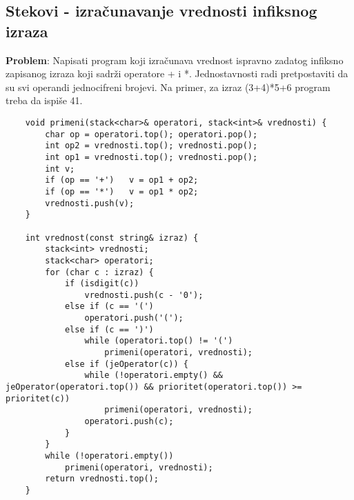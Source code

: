 \documentclass{article}
\begin{document}
\subsection{Stekovi - izračunavanje vrednosti infiksnog izraza}
\textbf{Problem}: Napisati program koji izračunava vrednost ispravno zadatog infiksno
zapisanog izraza koji sadrži operatore + i *. Jednostavnosti radi pretpostaviti
da su svi operandi jednocifreni brojevi. Na primer, za izraz (3+4)*5+6 program
treba da ispiše 41.
\begin{lstlisting}
    void primeni(stack<char>& operatori, stack<int>& vrednosti) {
        char op = operatori.top(); operatori.pop();
        int op2 = vrednosti.top(); vrednosti.pop();
        int op1 = vrednosti.top(); vrednosti.pop();
        int v;
        if (op == '+')   v = op1 + op2;
        if (op == '*')   v = op1 * op2;
        vrednosti.push(v);
    }
    
    int vrednost(const string& izraz) {
        stack<int> vrednosti;
        stack<char> operatori;
        for (char c : izraz) {
            if (isdigit(c))
                vrednosti.push(c - '0');
            else if (c == '(')
                operatori.push('(');
            else if (c == ')')
                while (operatori.top() != '(')
                    primeni(operatori, vrednosti);
            else if (jeOperator(c)) {
                while (!operatori.empty() && jeOperator(operatori.top()) && prioritet(operatori.top()) >= prioritet(c))
                    primeni(operatori, vrednosti);
                operatori.push(c);
            }
        }
        while (!operatori.empty())
            primeni(operatori, vrednosti);
        return vrednosti.top();
    }   
\end{lstlisting}
\end{document}
